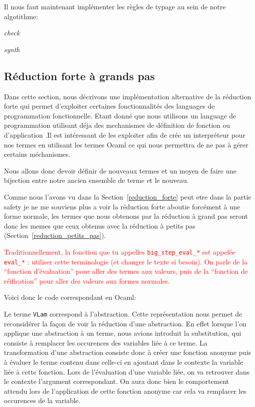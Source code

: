 \documentclass {article}
\newcommand{\codefrom}[3]
           {}
\theoremstyle{definition}
\theoremstyle{remark}
\newcommand{\todo}[1]{\textcolor{red}{#1}}
\newcommand{\fun}[1]{\lstinline!#1!}
\begin{document}
Il nous faut maintenant implémenter les règles de typage au sein de notre algotithme:

\emph{check}
\codefrom{typed}{lambda}{check_pair}
\emph{synth}
\codefrom{typed}{lambda}{synth_pair}



\subsection{Réduction forte à grands pas}


Dans cette section, nous décrivons une implémentation alternative de
la réduction forte qui permet d'exploiter certaines fonctionnalités des languages de programmation fonctionnelle.
Etant donné que nous utilisons un language de programmation utilisant déja
des mechanismes de définition de fonction ou d'application .Il est
intéressant de les exploiter afin de crée un interpréteur pour nos termes
en utilisant les termes Ocaml ce qui nous permettra de ne pas à
gérer certains méchanismes.

Nous allons donc devoir définir de nouveaux termes et un moyen de
faire une bijection entre notre ancien ensemble de terme et le nouveau.

Comme nous l'avons vu dans la Section~\ref{reduction_forte}  peut
etre dans la partie safety je ne me souviens plus a voir \fi la
réduction forte aboutie forcément à une forme normale, les termes que
nous obtenons par la réduction à grand pas seront donc les memes que
ceux obtenus avec la réduction à petits pas
(Section~\ref{reduction_petits_pas}).

\todo{Traditionnellement, la fonction que tu appelles
  \lstinline!big_step_eval_*! est appelée \lstinline!eval_*! :
  utiliser cette terminologie (et changer le texte si besoin). On
  parle de la ``fonction d'évaluation'' pour aller des termes aux
  valeurs, puis de la ``fonction de réification'' pour aller des
  valeurs aux formes normales.}

\newcommand{\VLam}{\lstinline!VLam!}
Voici donc le code correspondant en Ocaml:

\codefrom{typed}{lambda}{value}
\codefrom{typed}{lambda}{neutral}

Le terme \fun{VLam} correspond à l'abstraction.
Cette représentation nous permet de reconsidérer la façon de voir la 
réduction d'une abstraction. En effet lorsque l'on applique une abstraction
à un terme, nous avions introduit la substitution, qui consiste à remplacer les occurences 
des variables liée à ce terme. La transformation d'une abstraction consiste donc à 
créer une fonction anonyme puis à évaluer le terme contenu dans celle-ci en ajoutant dans le 
contexte la variable liée à cette fonction. Lors de l'évaluation d'une variable liée, on va
retrouver dans le contexte l'argument correspondant. On aura donc bien le comportement attendu
lors de l'application de cette fonction anonyme car cela va remplacer les occurences de la 
variable.
\end{document}
